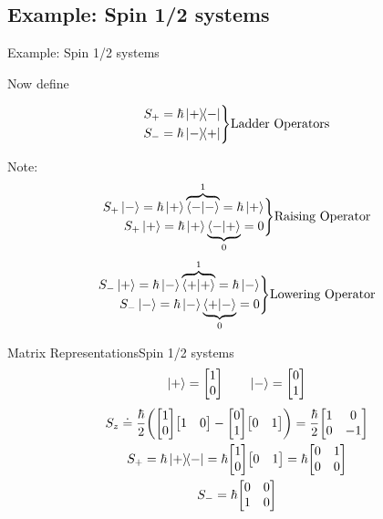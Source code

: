 \subsection{Example: Spin 1/2 systems}
\begin{frame}{Example: Spin 1/2 systems}

	Now define

	\[
		\begin{split}
			S_+ = \hbar \op{+}{-} \\
			S_- = \hbar \op{-}{+}
		\end{split}\Biggr\} \text{Ladder Operators}
	\]

	Note:
	\[
		\begin{split}
			S_+ \ket{-} = \hbar \ket + \overbrace{\ip{-}}^1 = \hbar\ket + \\
			S_+ \ket{+} = \hbar \ket + \underbrace{\ip{-}{+}}_0 =  0      \\
		\end{split} \Biggr\} \text{Raising Operator}
	\]
	\[
		\begin{split}
			S_- \ket{+} = \hbar \ket - \overbrace{\ip{+}}^1 = \hbar\ket - \\
			S_- \ket{-} = \hbar \ket - \underbrace{\ip{+}{-}}_0 =  0      \\
		\end{split} \Biggr\} \text{Lowering Operator}
	\]

\end{frame}


\begin{frame}{Matrix Representations}{Spin 1/2 systems}
	$$\ket{+} = \mqty[1 \\ 0] \qquad \ket- = \mqty[0 \\ 1]$$
	\begin{gather*}
		S_z \doteq \frac{\hbar}{2} \pqty{\mqty[1\\0] \mqty[1 & 0] - \mqty[0 \\ 1] \mqty[0 & 1]} = \frac{\hbar}{2} \mqty[\pmat{3}]\\
		S_+ = \hbar \op{+}{-} = \hbar \mqty[1 \\ 0 ] \mqty[0 & 1] = \hbar \mqty[0 & 1\\0 & 0]\\
		S_- = \hbar \mqty[0&0\\1&0]
	\end{gather*}
\end{frame}


